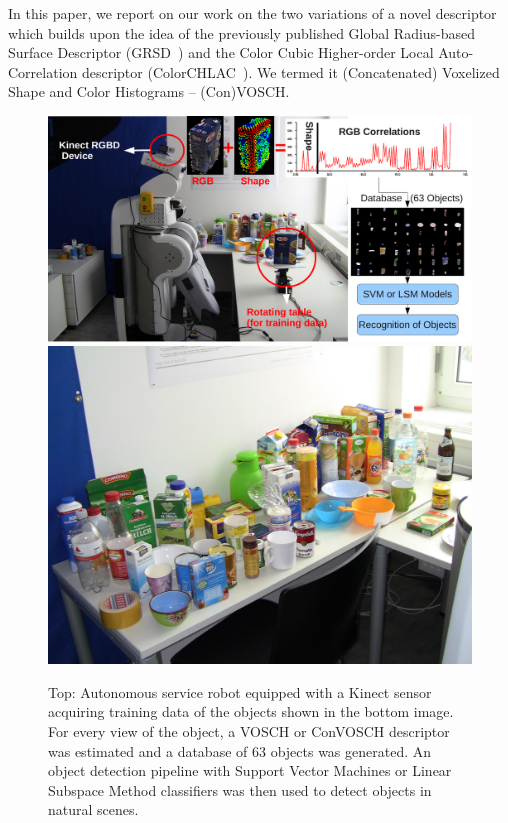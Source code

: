 \documentclass[conference]{sty/IEEEtran}
\begin{document}
In this paper, we report on our work on the two variations of a novel descriptor
which builds upon the idea of the previously 
published Global Radius-based Surface Descriptor (GRSD~\cite{GRSD10Humanoids}) and the
Color Cubic Higher-order Local Auto-Correlation descriptor (ColorCHLAC~\cite{kanezaki2010tvc}).
We termed it (Concatenated) Voxelized Shape and Color Histograms -- (Con)VOSCH.

\begin{figure}[htb!]
  \begin{center}
    \includegraphics[width=.99\columnwidth]{figures/firstpage/firstpage.pdf}
    \includegraphics[width=.99\columnwidth]{figures/objects/objects.jpg}
    \caption{Top: Autonomous service robot equipped with a Kinect sensor
    acquiring training data of the objects shown in the bottom image. For 
  every view of the object, a VOSCH or ConVOSCH descriptor was estimated and a database
of 63 objects was generated. An object detection pipeline with Support Vector
Machines or Linear Subspace Method classifiers was then used to detect objects
in natural scenes.}
    \label{fig:robot}
  \end{center}
\end{figure}
\end{document}
